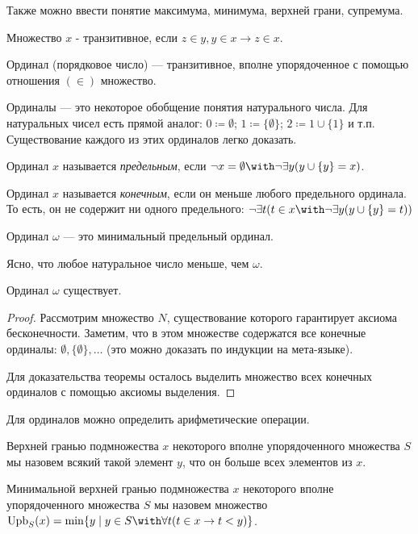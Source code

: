 Также можно ввести понятие максимума, минимума, верхней грани, супремума.

\begin{definition}
Множество $x$ - транзитивное, если $z \in y, y \in x \rightarrow z \in x$.
\end{definition}

\begin{definition}
Ординал (порядковое число) --- транзитивное, вполне упорядоченное с 
помощью отношения $(\in)$ множество.
\end{definition}

Ординалы --- это некоторое обобщение понятия натурального числа.
Для натуральных чисел есть прямой аналог:
$0 \coloneqq  \emptyset$; $1 \coloneqq  \{\emptyset\}$; $2 \coloneqq  1 \cup \{1\}$ и т.п.
Существование каждого из этих ординалов легко доказать.

\begin{definition}Ординал $x$ называется \emph{предельным}, если 
$\neg x = \emptyset \with \neg \exists y (y \cup \{y\} = x)$.
\end{definition}

\begin{definition}Ординал $x$ называется \emph{конечным}, если
он меньше любого предельного ординала. То есть, он не содержит
ни одного предельного:
$\neg\exists t (t \in x \with \neg \exists y (y \cup \{y\} = t))$
\end{definition}

\begin{definition}Ординал $\omega$ --- это минимальный
предельный ординал.
\end{definition}

Ясно, что любое натуральное число меньше, чем $\omega$. 

\begin{theorem}Ординал $\omega$ существует.
\end{theorem}
\begin{proof}
Рассмотрим множество $N$, существование которого гарантирует аксиома 
бесконечности. Заметим, что в этом множестве содержатся все конечные ординалы: 
$\emptyset, \{\emptyset\}, \dots$ (это можно доказать по индукции на
мета-языке).

Для доказательства теоремы осталось выделить множество всех конечных ординалов 
с помощью аксиомы выделения.
\end{proof}

Для ординалов можно определить арифметические операции.

\begin{definition}
Верхней гранью подмножества $x$ некоторого вполне упорядоченного
множества $S$ мы назовем всякий такой элемент $y$, что он больше
всех элементов из $x$.

Минимальной верхней гранью подмножества $x$ некоторого вполне упорядоченного
множества $S$ мы назовем множество 
$\operatorname{Upb}_S(x) = \min \{y \mid y \in S \with \forall t (t \in x \rightarrow t < y)\}$.
\end{definition}

